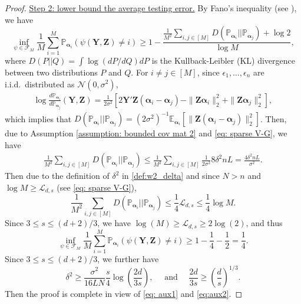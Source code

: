\documentclass[aos,preprint]{imsart}
\theoremstyle{plain}
\theoremstyle{definition}
\newcommand{\btheta}{\boldsymbol{\theta}}
\newcommand{\balpha}{\boldsymbol{\alpha}}
\newcommand{\bY}{\boldsymbol{Y}}
\newcommand{\bZ}{\boldsymbol{Z}}
\newcommand{\cF}{\mathcal{F}}
\newcommand{\Exp}{\mathbb{E}}
\newcommand{\Pro}{\mathbb{P}}
\begin{document}
\begin{appendix}
\begin{proof}
\noindent  
\underline{Step 2: lower bound the average testing error.}  
By Fano's inequality (see \cite[Theorem 4.10]{rigollet2023highdimensionalstatistics}), we have
$$\inf_{\psi \in \cF_M} \frac{1}{M}\sum_{i=1}^M \Pro_{\balpha_i}(\psi(\bY,\bZ) \neq i) \ge 1-\frac{\frac{1}{M^2}\sum_{i,j\in[M]}D(\Pro_{\balpha_i}|| \Pro_{\balpha_j})+\log2}{\log M},$$
where $D(P||Q)=\int \log(dP/dQ) dP$ is the Kullback-Leibler (KL) divergence between two distributions $P$ and $Q$. For $i \neq j \in [M]$, since $\epsilon_1,\ldots, \epsilon_n$ are i.i.d.~distributed as $\mathcal{N}(0,\sigma^2)$,
\begin{align*}
\log\frac{d \Pro_{\balpha_i}}{d\Pro_{\balpha_j}}(\bY,\bZ) = \frac{1}{2\sigma^2} \left[2\bY'\bZ(\balpha_i - \balpha_j) - \|\bZ \balpha_i\|_2^2 + \|\bZ \balpha_j\|_2^2 
\right],
\end{align*}
which implies that $D(\Pro_{\balpha_i}||\Pro_{\balpha_j}) = (2\sigma^2)^{-1}\Exp_{\balpha_i}\left[\|\bZ(\balpha_i-\balpha_j)\|_2^2\right]$. Then, due to Assumption \ref{assumption: bounded cov mat 2} and \eqref{eq: sparse V-G}, we have
\begin{align*}
  \frac{1}{M^2}\sum_{i,j\in[M]}D(\Pro_{\balpha_i}||\Pro_{\balpha_j}) \leq   \frac{1}{M^2}\sum_{i,j\in[M]} \frac{1}{2\sigma^2}8\delta^2 n L = \frac{4 \delta^2 n L}{\sigma^2}.
\end{align*}
Then due to the definition of $\delta^2$ in \eqref{def:w2_delta} and since $N > n$ and $\log M \geq \mathcal{L}_{d,s}$ (see \eqref{eq: sparse V-G}), 
$$
\frac{1}{M^2}\sum_{i,j\in[M]}D(\Pro_{\balpha_i}||\Pro_{\balpha_j}) \leq \frac{1}{4} \mathcal{L}_{d,s} \leq \frac{1}{4}\log M.
$$
Since $3 \leq s \leq (d+2)/3$, we have $\log(M) \geq \mathcal{L}_{d,s} \geq 2\log(2)$, and thus
$$
\inf_{\psi \in \cF_M} \frac{1}{M}\sum_{i=1}^M \Pro_{\balpha_i}(\psi(\bY,\bZ) \neq i) \ge 1 - \frac{1}{4} - \frac{1}{2} = \frac{1}{4}.
$$
Since $3 \leq s \leq (d+2)/3$, we further have
$$
\delta^2 \geq  \frac{\sigma^2}{16 LN} \frac{s}{4} \log\left(\frac{2 d}{ 3 s}\right), \quad \text{ and } \quad \frac{2d}{3s} \geq \left(\frac{d}{s}\right)^{1/3}.
$$
Then the proof is complete in view of \eqref{eq: aux1} and \eqref{eq:aux2}.
\end{proof}


\end{appendix}
\end{document}
